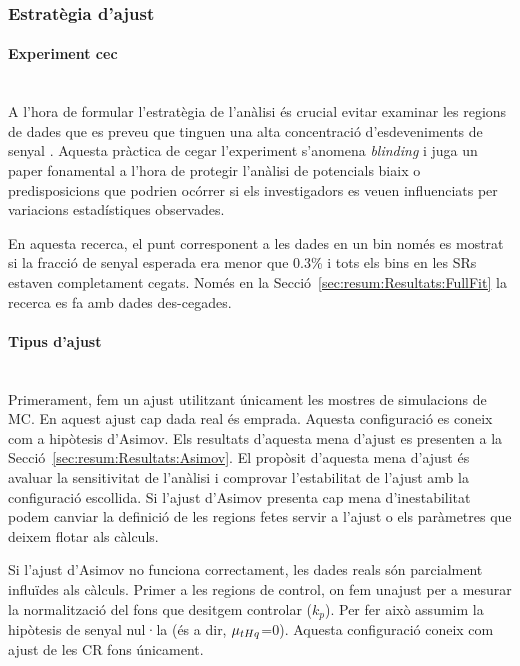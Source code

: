 \subsubsection{Estratègia d'ajust}

\paragraph{Experiment cec}\mbox{}\\
A l'hora de formular l'estratègia de l'anàlisi és crucial evitar examinar les regions de dades
que es preveu que tinguen una alta concentració d'esdeveniments de senyal \tHq.
Aquesta pràctica de cegar l'experiment s'anomena \textit{blinding} i juga un paper
fonamental a l'hora de protegir l'anàlisi de potencials biaix o predisposicions
que podrien ocórrer si els investigadors es veuen influenciats per variacions estadístiques observades.

En aquesta recerca, el punt corresponent a les dades en un bin només es mostrat si la fracció de 
senyal esperada era menor que 0.3\% i tots els bins en les SRs estaven completament cegats. 
Només en la Secció~\ref{sec:resum:Resultats:FullFit} la
recerca es fa amb dades des-cegades. 

\paragraph{Tipus d'ajust}\mbox{}\\
Primerament, fem un ajust utilitzant únicament les mostres de simulacions de MC. En aquest
ajust cap dada real és emprada. Aquesta configuració es coneix com a hipòtesis d'Asimov.
Els resultats d'aquesta mena d'ajust es presenten a la Secció~\ref{sec:resum:Resultats:Asimov}.
El propòsit d'aquesta mena d'ajust és avaluar la sensitivitat de l'anàlisi i comprovar l'estabilitat de 
l'ajust amb la configuració escollida. Si l'ajust d'Asimov presenta cap mena d'inestabilitat podem 
canviar la definició de les regions fetes servir a l'ajust o els paràmetres que deixem flotar als càlculs.

Si l'ajust d'Asimov no funciona correctament, les dades reals són parcialment influïdes als càlculs. 
Primer a les regions de control, on fem unajust per a mesurar la normalització del fons que desitgem 
controlar ($k_{p}$). Per fer això assumim la hipòtesis de senyal nul·la (és a dir, $\mu_{tHq}$=0). 
Aquesta configuració coneix com ajust de les CR fons únicament.

